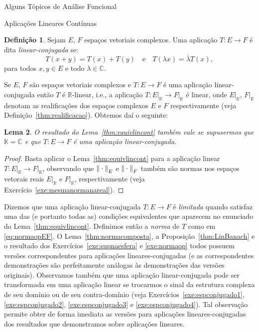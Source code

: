 \documentclass[oneside,final,11pt]{amsbook}
\newcommand{\R}{\mathds R}
\newcommand{\C}{\mathds C}
\newcommand{\K}{\mathds K}
\newcommand{\norma}[2]{\Vert#1\Vert_{\lower2pt\hbox{$\scriptstyle#2$}}}
\theoremstyle{remark}\newtheorem{exercise}{Exercício}[chapter]
\theoremstyle{remark}\newtheorem{*exercise}[exercise]{\hbox to 0pt{\hskip 0pt minus 1fil*}Exercício}
\theoremstyle{definition}\newtheorem{exdefin}{Definição}[chapter]
\theoremstyle{plain}\newtheorem{teo}{Teorema}[section]
\theoremstyle{plain}\newtheorem{lem}[teo]{Lema}
\theoremstyle{plain}\newtheorem{prop}[teo]{Proposição}
\theoremstyle{plain}\newtheorem{cor}[teo]{Corolário}
\theoremstyle{definition}\newtheorem{defin}[teo]{Definição}
\theoremstyle{remark}\newtheorem{rem}[teo]{Observação}
\theoremstyle{definition}\newtheorem{notation}[teo]{Notação}
\theoremstyle{definition}\newtheorem{convention}[teo]{Convenção}
\theoremstyle{definition}\newtheorem{example}[teo]{Exemplo}
\numberwithin{section}{chapter}
\numberwithin{equation}{section}
\begin{document}
\begin{chapter}{Alguns Tópicos de Análise Funcional}
\begin{section}{Aplicações Lineares Contínuas}
\begin{defin}
Sejam $E$, $F$ espaços vetoriais complexos. Uma aplicação $T:E\to F$ é dita
{\em linear-conjugada\/}%
 se:
\[T(x+y)=T(x)+T(y)\quad\text{e}\quad T(\lambda x)=\bar\lambda T(x),\]
para todos $x,y\in E$ e todo $\lambda\in\C$.
\end{defin}
Se $E$, $F$ são espaços vetoriais complexos e $T:E\to F$ é uma aplicação linear-conjugada
então $T$ é $\R$-linear, i.e., a aplicação $T:E\vert_\R\to F\vert_\R$ é linear,
onde $E\vert_\R$, $F\vert_\R$ denotam as realificações dos espaços complexos $E$ e $F$
respectivamente (veja Definição~\ref{thm:realificacao}). Obtemos daí o seguinte:
\begin{lem}
O resultado do Lema~\ref{thm:equivlincont} também vale se supusermos que $\K=\C$ e
que $T:E\to F$ é uma aplicação linear-conjugada.
\end{lem}
\begin{proof}
Basta aplicar o Lema~\ref{thm:equivlincont} para a aplicação linear $T:E\vert_\R\to F\vert_\R$,
observando que $\norma\cdot E$ e $\norma\cdot F$ também são normas nos espaços vetorais
reais $E\vert_\R$ e $F\vert_\R$, respectivamente (veja Exercício~\ref{exe:mesmanormanareal}).
\end{proof}
Dizemos que uma aplicação linear-conjugada $T:E\to F$ é
{\em limitada\/}%
quando satisfaz uma das (e portanto todas as) condições equivalentes que aparecem no enunciado do Lema~\ref{thm:equivlincont}.
Definimos então a {\em norma\/}%
de $T$ como em \eqref{eq:normaopEF}. O Lema~\ref{thm:normacomposta}, a Proposição~\ref{thm:LinBanach}
e o resultado dos Exercícios~\ref{exe:supnaesfera} e \ref{exe:normaop} todos possuem versões correspondentes para
aplicações lineares-conjugadas (e as correspondentes demonstrações são perfeitamente análogas às demonstrações
das versões originais).
Observamos também que uma aplicação linear-conjugada pode ser transformada em uma aplicação
linear se trocarmos o sinal da estrutura complexa de seu domínio ou de seu contra-domínio
(veja Exercícios~\ref{exe:espconjugado1}, \ref{exe:espconjugado2}, \ref{exe:espconjugado3}
e \ref{exe:espconjugado4}). Tal observação permite obter de forma imediata as versões para aplicações
lineares-conjugadas dos resultados que demonstramos sobre aplicações lineares.


\end{section}
\end{chapter}
\end{document}
